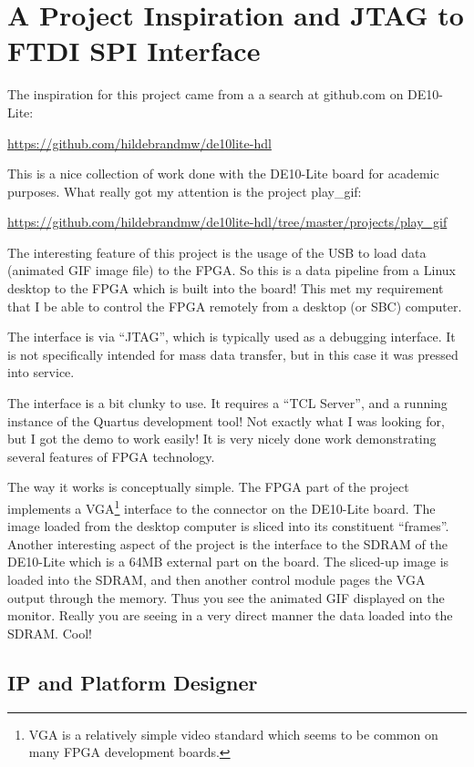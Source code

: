 \section{A Project Inspiration and JTAG to FTDI SPI Interface}

The inspiration for this project came from a a search at github.com on DE10-Lite:

\url{https://github.com/hildebrandmw/de10lite-hdl}

This is a nice collection of work done with the DE10-Lite board for academic purposes.
What really got my attention is the project play\_gif:

\url{https://github.com/hildebrandmw/de10lite-hdl/tree/master/projects/play_gif}

The interesting feature of this project is the usage of the USB to load data (animated GIF image file)
to the FPGA.  So this is a data pipeline from a Linux desktop to the FPGA which is built into the board!
This met my requirement that I be able to control the FPGA remotely from a desktop (or SBC) computer.

The interface is via ``JTAG'', which is typically used as a debugging interface.  It is not specifically intended for mass data transfer, but in this case it was pressed into service.

The interface is a bit clunky to use.  It requires a ``TCL Server'', and a running instance of the Quartus development tool!  Not exactly what I was looking for, but I got the demo to work easily!  It is very nicely done work demonstrating several features of FPGA technology.

The way it works is conceptually simple.  The FPGA part of the project implements a VGA\footnote{VGA is a relatively simple video standard which seems to be common on many FPGA development boards.} interface to the connector on the DE10-Lite board.  The image loaded from the desktop computer is sliced into its constituent ``frames''.
Another interesting aspect of the project is the interface to the SDRAM of the DE10-Lite which is a 64MB external part on the board.  The sliced-up image is loaded into the SDRAM, and then another control module pages the VGA output through the memory.  Thus you see the animated GIF displayed on the monitor.  Really you are seeing in a very direct manner the data loaded into the SDRAM.  Cool!

\subsection{IP and Platform Designer}

